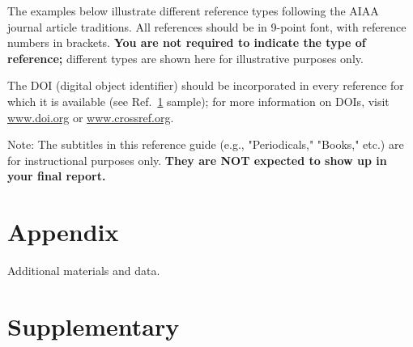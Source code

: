 \documentclass{engr1000j-s2}
\begin{document}
  The examples below illustrate different reference types following the AIAA
  journal article traditions. All references should be in 9-point font, with
  reference numbers in brackets. \textbf{You are not required to indicate the type of reference;}
  different types are shown here for illustrative purposes only.

  The DOI (digital object identifier) should be incorporated in every reference
  for which it is available (see Ref.~\href{https://doi.org/10.1234/example.doi}{1}
  sample); for more information on DOIs, visit \href{https://www.doi.org}{www.doi.org}
  or \href{https://www.crossref.org}{www.crossref.org}.

  

  Note: The subtitles in this reference guide (e.g., "Periodicals," "Books," etc.)
  are for instructional purposes only. \textbf{They are NOT expected to show up in your
  final report.}

  \newpage
  \section{Appendix}
  Additional materials and data.

  \newpage
  \section{Supplementary}
\end{document}
